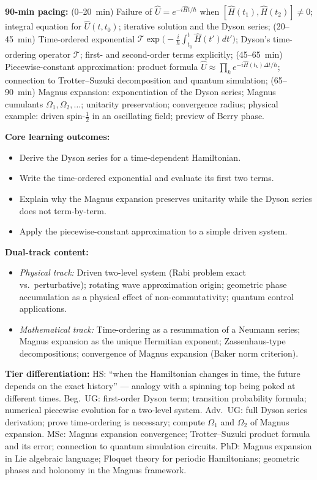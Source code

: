 \documentclass[11pt,a4paper]{article}
\begin{document}
\medskip
\begin{tcolorbox}[modulebox, title={Module~I.3 --- Lecture L06: Time Evolution II --- Time-Dependent and Non-Commuting Hamiltonians}]
\textbf{90-min pacing:} (0--20~min) Failure of $\hat{U}=e^{-i\hat{H}t/\hbar}$ when
$[\hat{H}(t_1),\hat{H}(t_2)]\neq 0$; integral equation for $\hat{U}(t,t_0)$;
iterative solution and the Dyson series;
(20--45~min) Time-ordered exponential
$\mathcal{T}\exp\!\bigl(-\tfrac{i}{\hbar}\int_{t_0}^{t}\hat{H}(t')dt'\bigr)$;
Dyson's time-ordering operator $\mathcal{T}$; first- and second-order terms explicitly;
(45--65~min) Piecewise-constant approximation: product formula
$\hat{U}\approx\prod_k e^{-i\hat{H}(t_k)\Delta t/\hbar}$;
connection to Trotter--Suzuki decomposition and quantum simulation;
(65--90~min) Magnus expansion: exponentiation of the Dyson series;
Magnus cumulants $\Omega_1,\Omega_2,\ldots$; unitarity preservation;
convergence radius; physical example: driven spin-$\tfrac{1}{2}$ in an
oscillating field; preview of Berry phase.

\medskip\textbf{Core learning outcomes:}
\begin{itemize}[leftmargin=1.4em,topsep=2pt,itemsep=1pt]
  \item Derive the Dyson series for a time-dependent Hamiltonian.
  \item Write the time-ordered exponential and evaluate its first two terms.
  \item Explain why the Magnus expansion preserves unitarity while the Dyson series does not term-by-term.
  \item Apply the piecewise-constant approximation to a simple driven system.
\end{itemize}

\medskip\textbf{Dual-track content:}
\begin{itemize}[leftmargin=1.4em,topsep=2pt,itemsep=1pt]
  \item \textit{Physical track:} Driven two-level system (Rabi problem exact vs.\ perturbative);
    rotating wave approximation origin; geometric phase accumulation as a physical effect
    of non-commutativity; quantum control applications.
  \item \textit{Mathematical track:} Time-ordering as a resummation of a Neumann series;
    Magnus expansion as the unique Hermitian exponent; Zassenhaus-type decompositions;
    convergence of Magnus expansion (Baker norm criterion).
\end{itemize}

\medskip\textbf{Tier differentiation:}
HS: ``when the Hamiltonian changes in time, the future depends on the exact history''
--- analogy with a spinning top being poked at different times.
Beg.\ UG: first-order Dyson term; transition probability formula;
numerical piecewise evolution for a two-level system.
Adv.\ UG: full Dyson series derivation; prove time-ordering is necessary;
compute $\Omega_1$ and $\Omega_2$ of Magnus expansion.
MSc: Magnus expansion convergence; Trotter--Suzuki product formula and its error;
connection to quantum simulation circuits.
PhD: Magnus expansion in Lie algebraic language; Floquet theory for periodic
Hamiltonians; geometric phases and holonomy in the Magnus framework.


\end{tcolorbox}
\end{document}
